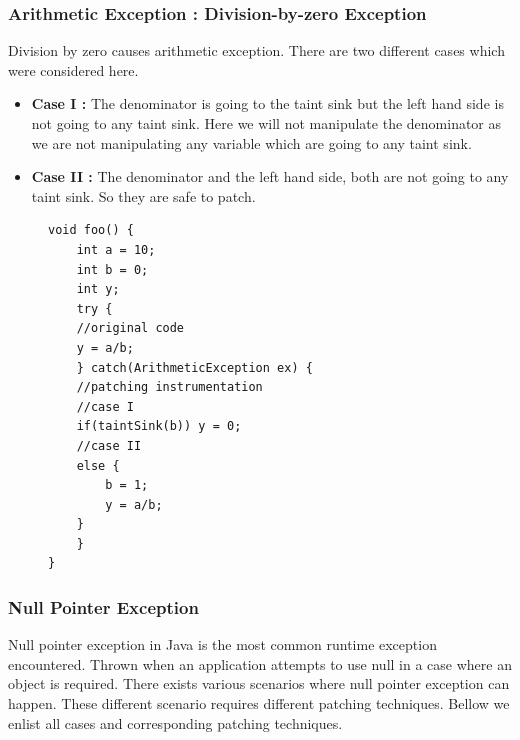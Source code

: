 \subsubsection{Arithmetic Exception : Division-by-zero Exception}

Division by zero causes arithmetic exception. There are two different cases
which were considered here. 
\begin{itemize}
 \item \textbf{Case I :} The denominator is going to the taint sink but
the left hand side is not going to any taint sink. Here we will not
manipulate the denominator as we are not manipulating any variable which are
going to any taint sink.
 \item \textbf{Case II :} The denominator and the left hand side, both are not
going to any taint sink. So they are safe to patch.
\end{itemize}

\lstset{language=Java, caption=arithmetic exception : division-by-zero patching,
label=patchingexample2}
\begin{figure}[t]
\begin{lstlisting}[countblanklines=false]
void foo() {
    int a = 10;
    int b = 0;
    int y;
    try {
	//original code
	y = a/b;
    } catch(ArithmeticException ex) {
	//patching instrumentation
	//case I
	if(taintSink(b)) y = 0;
	//case II
	else {
	    b = 1;
	    y = a/b;
	}
    }
}
\end{lstlisting}
\end{figure}

\subsubsection{Null Pointer Exception}

Null pointer exception in Java is the most common runtime exception
encountered. 
Thrown when an application attempts to use null in a case where an object is
required. There exists various scenarios where null pointer exception can
happen. These different scenario requires different patching techniques. Bellow
we enlist all cases and corresponding patching techniques.


